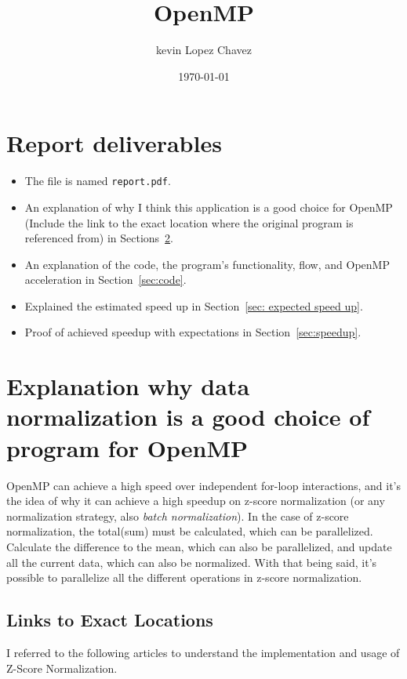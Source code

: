 \documentclass{article}
\title{ OpenMP}
\author{kevin Lopez Chavez}
\date{\today}
\begin{document}
\maketitle

\section{Report deliverables}
\begin{itemize}
    \item The file is named \texttt{report.pdf}.
    \item An explanation of why I think this application is a good choice for OpenMP (Include the link to the exact location where the original program is referenced from) in Sections~\ref{sec:links}.
    \item An explanation of the code, the program's functionality, flow, and OpenMP acceleration in Section~\ref{sec:code}.
    \item Explained the estimated speed up in Section~\ref{sec: expected speed up}.
    \item Proof of achieved speedup with expectations in Section~\ref{sec:speedup}.
\end{itemize}


\section{Explanation why data normalization is a good choice of program for OpenMP} \label{sec:links}
OpenMP can achieve a high speed over independent for-loop interactions, and it's the idea of why it can achieve a high speedup on z-score normalization (or any normalization strategy, also \textit{batch normalization}).
In the case of z-score normalization, the total(sum) must be calculated, which can be parallelized.
Calculate the difference to the mean, which can also be parallelized, and update all the current data, which can also be normalized.
With that being said, it's possible to parallelize all the different operations in z-score normalization.

\subsection{Links to Exact Locations} \label{sec: exact links}
I referred to the following articles to understand the implementation and usage of Z-Score Normalization.
\end{document}
